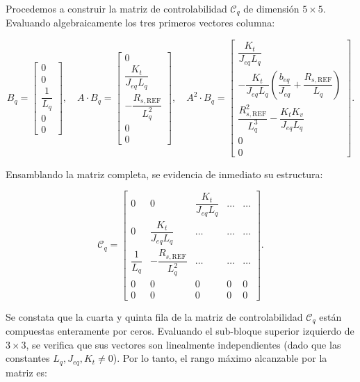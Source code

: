 \documentclass[10pt,a4paper]{article}
\begin{document}
Procedemos a construir la matriz de controlabilidad $\mathcal{C}_q$ de dimensión $5 \times 5$. Evaluando algebraicamente los tres primeros vectores columna:

\begin{equation}
    B_q = \begin{bmatrix} 0 \\[1mm] 0 \\[1mm] \dfrac{1}{L_q} \\[2mm] 0 \\[1mm] 0 \end{bmatrix}, \quad
    A \cdot B_q = \begin{bmatrix} 0 \\[1mm] \dfrac{K_t}{J_{eq} L_q} \\[3mm] -\dfrac{R_{s,\mathrm{REF}}}{L_q^2} \\[3mm] 0 \\[1mm] 0 \end{bmatrix}, \quad
    A^2 \cdot B_q = \begin{bmatrix} \dfrac{K_t}{J_{eq} L_q} \\[3mm] -\dfrac{K_t}{J_{eq} L_q} \left( \dfrac{b_{eq}}{J_{eq}} + \dfrac{R_{s,\mathrm{REF}}}{L_q} \right) \\[4mm] \dfrac{R_{s,\mathrm{REF}}^2}{L_q^3} - \dfrac{K_t K_v}{J_{eq} L_q} \\[3mm] 0 \\[1mm] 0 \end{bmatrix}.
\end{equation}

Ensamblando la matriz completa, se evidencia de inmediato su estructura:

\begin{equation}
    \mathcal{C}_q =
    \begin{bmatrix}
        0 & 0 & \dfrac{K_t}{J_{eq} L_q} & \dots & \dots \\[4mm]
        0 & \dfrac{K_t}{J_{eq} L_q} & \dots & \dots & \dots \\[4mm]
        \dfrac{1}{L_q} & -\dfrac{R_{s,\mathrm{REF}}}{L_q^2} & \dots & \dots & \dots \\[4mm]
        0 & 0 & 0 & 0 & 0 \\[2mm]
        0 & 0 & 0 & 0 & 0
    \end{bmatrix}.
    \label{eq:matriz_controlabilidad_q}
\end{equation}

Se constata que la cuarta y quinta fila de la matriz de controlabilidad $\mathcal{C}_q$ están compuestas enteramente por ceros. Evaluando el sub-bloque superior izquierdo de $3 \times 3$, se verifica que sus vectores son linealmente independientes (dado que las constantes $L_q, J_{eq}, K_t \neq 0$). Por lo tanto, el rango máximo alcanzable por la matriz es:
\end{document}
